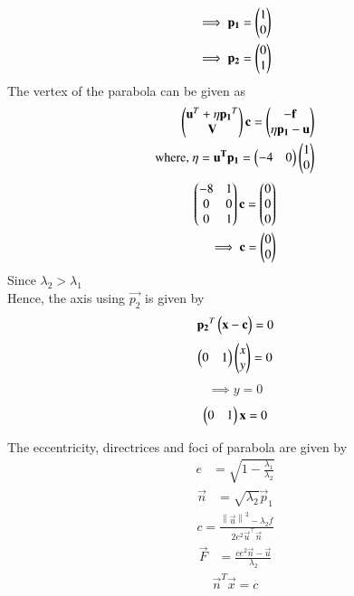 \documentclass[journal,12pt,twocolumn]{IEEEtran}
\newcommand{\norm}[1]{\left\lVert#1\right\rVert}
\begin{document}
\begin{align}
   \implies \mathbf{p_1}=\begin{pmatrix}1\\0\end{pmatrix}\\
   \implies \mathbf{p_2}=\begin{pmatrix}0\\1\end{pmatrix}
\end{align}
The vertex of the parabola can be given as
\begin{align}
    \begin{pmatrix}\mathbf{u}^T+\eta\mathbf{p_1}^T\\\mathbf{V}\end{pmatrix}\mathbf{c}=\begin{pmatrix}\mathbf{-f}\\\eta\mathbf{p_1}-\mathbf{u}\end{pmatrix}\\
   \text{where, } \eta=\mathbf{u^T}\mathbf{p_1}=\begin{pmatrix}-4&0\end{pmatrix}\begin{pmatrix}1\\0\end{pmatrix}
    \end{align}
\begin{align}
    \begin{pmatrix}-8&1\\0&0\\0&1\end{pmatrix}\mathbf{c}=\begin{pmatrix}0\\0\\0\end{pmatrix}\\
    \implies \mathbf{c}=\begin{pmatrix}0\\0\end{pmatrix}
\end{align}
Since $\lambda_2 > \lambda_1$\\
Hence, the axis using $\vec{p_2}$ is given by
\begin{align}
    \mathbf{p_2}^T\begin{pmatrix}\mathbf{x}-\mathbf{c}\end{pmatrix}=0
    \end{align}
    \begin{align}
     \begin{pmatrix}0&1\end{pmatrix}\begin{pmatrix}x\\y\end{pmatrix}=0   
    \end{align}
    \begin{align}
       \implies y=0 
    \end{align}
    \begin{align}
    \begin{pmatrix}0&1\end{pmatrix}\mathbf{x}=0
\end{align}
\begin{theorem}
The eccentricity, directrices and foci of parabola are given by\\ 
\begin{align}
    e&= \sqrt{1-\frac{\lambda_1}{\lambda_2}} \label{eq:1}
\end{align}
\begin{align}
  \vec{n}&= \sqrt{\lambda_2}\vec{p}_1 \label{eq:2}
  \end{align}
  \begin{align}
  c = \frac{\norm{\vec{u}}^2 - \lambda_2 f   }{2e^2\vec{u}^{\top}\vec{n}} \label{eq:3}
  \end{align}
 \begin{align}
  \vec{F}  &= \frac{ce^2\vec{n}-\vec{u}}{\lambda_2}\label{eq:4}
\end{align}
\begin{align}
\vec{n}^T \vec{x}=c \label{eq:5}
 \end{align}
\end{theorem}
\end{document}
